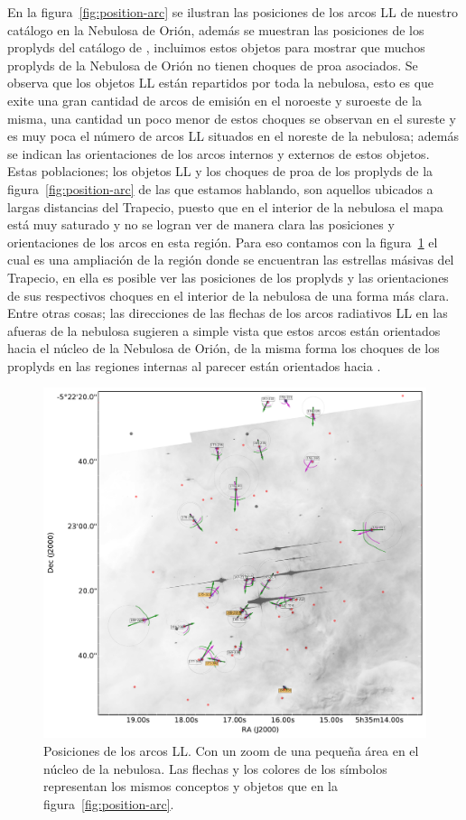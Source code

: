 En la figura~\ref{fig:position-arc} se ilustran las posiciones de los arcos LL de nuestro catálogo en la Nebulosa de Orión, además se muestran las posiciones de los proplyds del catálogo de \citet{Ricci:2008}, incluimos estos objetos para mostrar que muchos proplyds  de la Nebulosa de Orión no tienen choques de proa asociados. Se observa que los objetos LL están repartidos por toda la nebulosa, esto es que exite una gran cantidad de arcos de emisión en el noroeste y suroeste de la misma, una cantidad un poco menor de estos choques se observan en el sureste y es muy poca el número de arcos LL situados en el noreste de la nebulosa; además se indican las orientaciones de los arcos internos y externos de estos objetos. Estas poblaciones; los objetos LL y los choques de proa de los proplyds de la figura~\ref{fig:position-arc} de las que estamos hablando, son aquellos ubicados a largas distancias del Trapecio, puesto que en el interior de la nebulosa el mapa está muy saturado y no se logran ver de manera clara las posiciones y orientaciones de los arcos en esta región. Para eso contamos con la figura~\ref{fig:position-arc-zoom} el cual es una ampliación de la región donde se encuentran las estrellas másivas del Trapecio, en ella es posible ver las posiciones de los proplyds y las orientaciones de sus respectivos choques en el interior de la nebulosa de una forma más clara. Entre otras cosas; las direcciones de las flechas de los arcos radiativos LL en las afueras de la nebulosa sugieren a simple vista que estos arcos están orientados hacia el núcleo de la Nebulosa de Orión, de la misma forma los choques de los proplyds en las regiones internas al parecer están orientados hacia \thC{}.



\begin{figure}
  \centering
  \includegraphics[width=\linewidth]{ll-pos-image-zoom}
  \caption{Posiciones de los arcos LL. Con un zoom de una pequeña área en el núcleo de la nebulosa. Las flechas y los colores de los símbolos representan los mismos conceptos y objetos que en la figura~\ref{fig:position-arc}.}
  \label{fig:position-arc-zoom}
\end{figure}

